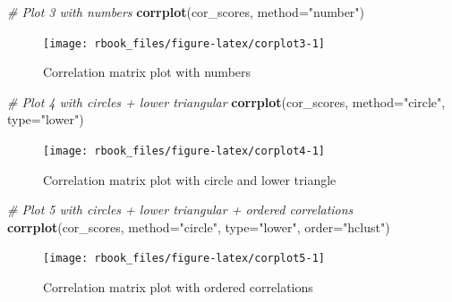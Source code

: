 \documentclass[]{book}
\newenvironment{Shaded}{\begin{snugshade}}{\end{snugshade}}
\newcommand{\CommentTok}[1]{\textcolor[rgb]{0.56,0.35,0.01}{\textit{#1}}}
\newcommand{\DataTypeTok}[1]{\textcolor[rgb]{0.13,0.29,0.53}{#1}}
\newcommand{\KeywordTok}[1]{\textcolor[rgb]{0.13,0.29,0.53}{\textbf{#1}}}
\newcommand{\NormalTok}[1]{#1}
\newcommand{\StringTok}[1]{\textcolor[rgb]{0.31,0.60,0.02}{#1}}
\begin{document}
\begin{Shaded}
\begin{Highlighting}[]
\CommentTok{# Plot 3 with numbers}
\KeywordTok{corrplot}\NormalTok{(cor_scores, }\DataTypeTok{method=}\StringTok{"number"}\NormalTok{)}
\end{Highlighting}
\end{Shaded}

\begin{figure}

{\centering \texttt{[image: rbook\_files/figure-latex/corplot3-1]} 

}

\caption{Correlation matrix plot with numbers}\label{fig:corplot3}
\end{figure}

\begin{Shaded}
\begin{Highlighting}[]
\CommentTok{# Plot 4 with circles + lower triangular}
\KeywordTok{corrplot}\NormalTok{(cor_scores, }\DataTypeTok{method=}\StringTok{"circle"}\NormalTok{, }\DataTypeTok{type=}\StringTok{"lower"}\NormalTok{)}
\end{Highlighting}
\end{Shaded}

\begin{figure}

{\centering \texttt{[image: rbook\_files/figure-latex/corplot4-1]} 

}

\caption{Correlation matrix plot with circle and lower triangle}\label{fig:corplot4}
\end{figure}

\begin{Shaded}
\begin{Highlighting}[]
\CommentTok{# Plot 5 with circles + lower triangular + ordered correlations}
\KeywordTok{corrplot}\NormalTok{(cor_scores, }\DataTypeTok{method=}\StringTok{"circle"}\NormalTok{, }\DataTypeTok{type=}\StringTok{"lower"}\NormalTok{, }\DataTypeTok{order=}\StringTok{"hclust"}\NormalTok{)}
\end{Highlighting}
\end{Shaded}

\begin{figure}

{\centering \texttt{[image: rbook\_files/figure-latex/corplot5-1]} 

}

\caption{Correlation matrix plot with ordered correlations}\label{fig:corplot5}
\end{figure}
\end{document}
